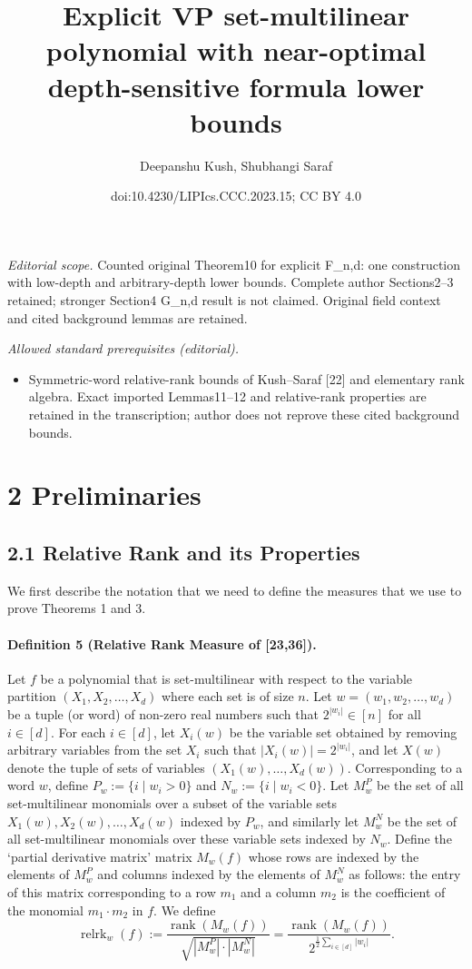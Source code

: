 \documentclass[10pt,a4paper]{article}
\title{Explicit VP set-multilinear polynomial with near-optimal depth-sensitive formula lower bounds}
\author{Deepanshu Kush, Shubhangi Saraf}
\date{doi:10.4230/LIPIcs.CCC.2023.15; CC BY 4.0}
\begin{document}
\maketitle
\noindent\textit{Editorial scope.} Counted original Theorem10 for explicit F\_n,d: one construction with low-depth and arbitrary-depth lower bounds. Complete author Sections2–3 retained; stronger Section4 G\_n,d result is not claimed. Original field context and cited background lemmas are retained.\par\medskip
\noindent\textit{Allowed standard prerequisites (editorial).}\begin{itemize}
\item Symmetric-word relative-rank bounds of Kush–Saraf [22] and elementary rank algebra. Exact imported Lemmas11–12 and relative-rank properties are retained in the transcription; author does not reprove these cited background bounds.
\end{itemize}\medskip
\section*{2 Preliminaries}
\subsection*{2.1 Relative Rank and its Properties}
We first describe the notation that we need to define the measures that we use to prove Theorems 1 and 3.
\paragraph{Definition 5 (Relative Rank Measure of [23,36]).} Let $f$ be a polynomial that is set-multilinear with respect to the variable partition $(X_1,X_2,\ldots,X_d)$ where each set is of size $n$. Let $w=(w_1,w_2,\ldots,w_d)$ be a tuple (or word) of non-zero real numbers such that $2^{|w_i|}\in[n]$ for all $i\in[d]$. For each $i\in[d]$, let $X_i(w)$ be the variable set obtained by removing arbitrary variables from the set $X_i$ such that $|X_i(w)|=2^{|w_i|}$, and let $X(w)$ denote the tuple of sets of variables $(X_1(w),\ldots,X_d(w))$. Corresponding to a word $w$, define $P_w:=\{i\mid w_i>0\}$ and $N_w:=\{i\mid w_i<0\}$. Let $M_w^P$ be the set of all set-multilinear monomials over a subset of the variable sets $X_1(w),X_2(w),\ldots,X_d(w)$ indexed by $P_w$, and similarly let $M_w^N$ be the set of all set-multilinear monomials over these variable sets indexed by $N_w$.
Define the `partial derivative matrix' matrix $M_w(f)$ whose rows are indexed by the elements of $M_w^P$ and columns indexed by the elements of $M_w^N$ as follows: the entry of this matrix corresponding to a row $m_1$ and a column $m_2$ is the coefficient of the monomial $m_1\cdot m_2$ in $f$. We define
\[\operatorname{relrk}_w(f):=\frac{\operatorname{rank}(M_w(f))}{\sqrt{|M_w^P|\cdot|M_w^N|}}=\frac{\operatorname{rank}(M_w(f))}{2^{\frac12\sum_{i\in[d]}|w_i|}}.\]
\end{document}
